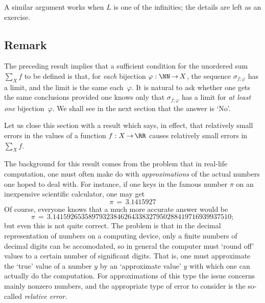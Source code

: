         A similar argument works when $L$ is one of the infinities; the details are left as an exercise.

\V
\V

            \subsection{\small{\bf Remark}}
            \label{RemrkG20.130}

\V

        The preceding result implies that a sufficient condition for the unordered sum $\sum_{X} f$ to be defined is that, for {\em each} bijection ${\varphi}:{\NN} \,{\rightarrow}\, X$,
    the sequence ${\sigma}_{f;{\varphi}}$ has a limit, and the limit is the same each~${\varphi}$.
    It is natural to ask whether one gets the same conclusions provided one knows only that ${\sigma}_{f;{\varphi}}$ has a limit for {\em at least one} bijection~${\varphi}$.
    We shall see in the next section that the answer is `No'.

\V
\V

        Let us close this section with a result which says, in effect, that relatively small errors in the values of a function $f:X \,{\rightarrow}\, {\RR}$ causes relatively small errors in $\sum_{X} f$.

        The background for this result comes from the problem that in real-life computation,
    one must often make do with {\em approximations} of the actual numbers one hoped to deal with.
    For instance, if one keys in the famous number ${\pi}$ on an inexpensive scientific calculator, one may get
        \begin{displaymath}
        {\pi} \,=\, 3.1415927
        \end{displaymath}
    Of course, everyone knows that a much more accurate answer would be
        \begin{displaymath}
        {\pi} \,=\, 3.14159265358979323846264338327950288419716939937510;
        \end{displaymath}
    but even this is not quite correct. The problem is that in the decimal representation of numbers on a computing device,
    only a finite numbers of decimal digits can be accomodated, so in general the computer must `round off' values to a certain number of significant digits.
    That is, one must approximate the `true' value of a number $y$ by an `approximate value' $\hat{y}$ with which one can actually do the computation.
    For approximations of this type the issue concerns mainly nonzero numbers, and the appropriate type of error to consider is the so-called {\em relative error}.

